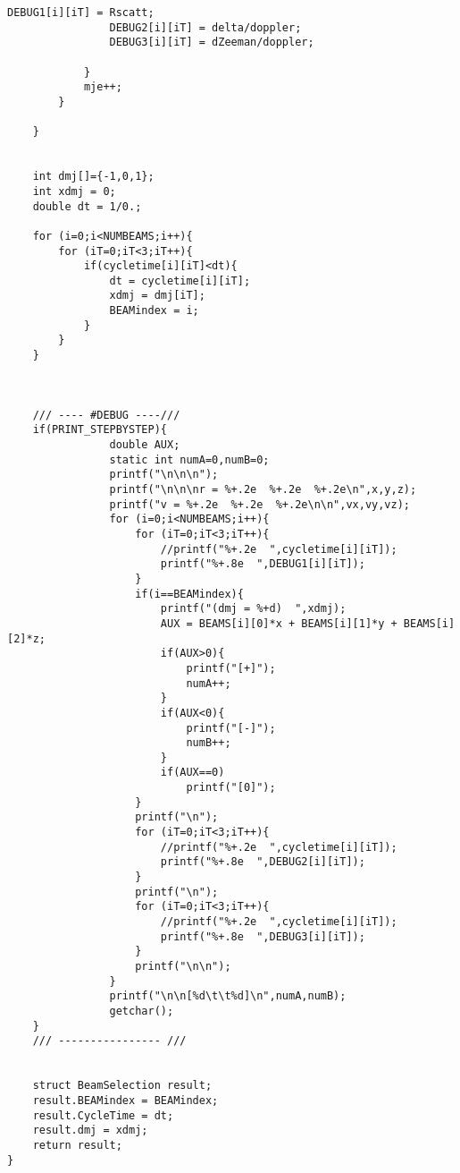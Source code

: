 \begin{lstlisting}[style=CStyle]
                DEBUG1[i][iT] = Rscatt;
                DEBUG2[i][iT] = delta/doppler;
                DEBUG3[i][iT] = dZeeman/doppler;

            }
            mje++;
        }

    }


    int dmj[]={-1,0,1};
    int xdmj = 0;
    double dt = 1/0.;

    for (i=0;i<NUMBEAMS;i++){
        for (iT=0;iT<3;iT++){
            if(cycletime[i][iT]<dt){
                dt = cycletime[i][iT];
                xdmj = dmj[iT];
                BEAMindex = i;
            }
        }
    }



    /// ---- #DEBUG ----///
    if(PRINT_STEPBYSTEP){
                double AUX;
                static int numA=0,numB=0;
                printf("\n\n\n");
                printf("\n\n\nr = %+.2e  %+.2e  %+.2e\n",x,y,z);
                printf("v = %+.2e  %+.2e  %+.2e\n\n",vx,vy,vz);
                for (i=0;i<NUMBEAMS;i++){
                    for (iT=0;iT<3;iT++){
                        //printf("%+.2e  ",cycletime[i][iT]);
                        printf("%+.8e  ",DEBUG1[i][iT]);
                    }
                    if(i==BEAMindex){
                        printf("(dmj = %+d)  ",xdmj);
                        AUX = BEAMS[i][0]*x + BEAMS[i][1]*y + BEAMS[i][2]*z;
                        if(AUX>0){
                            printf("[+]");
                            numA++;
                        }
                        if(AUX<0){
                            printf("[-]");
                            numB++;
                        }
                        if(AUX==0)
                            printf("[0]");
                    }
                    printf("\n");
                    for (iT=0;iT<3;iT++){
                        //printf("%+.2e  ",cycletime[i][iT]);
                        printf("%+.8e  ",DEBUG2[i][iT]);
                    }
                    printf("\n");
                    for (iT=0;iT<3;iT++){
                        //printf("%+.2e  ",cycletime[i][iT]);
                        printf("%+.8e  ",DEBUG3[i][iT]);
                    }
                    printf("\n\n");
                }
                printf("\n\n[%d\t\t%d]\n",numA,numB);
                getchar();
    }
	/// ---------------- ///


    struct BeamSelection result;
    result.BEAMindex = BEAMindex;
    result.CycleTime = dt;
    result.dmj = xdmj;
    return result;
}


\end{lstlisting}
